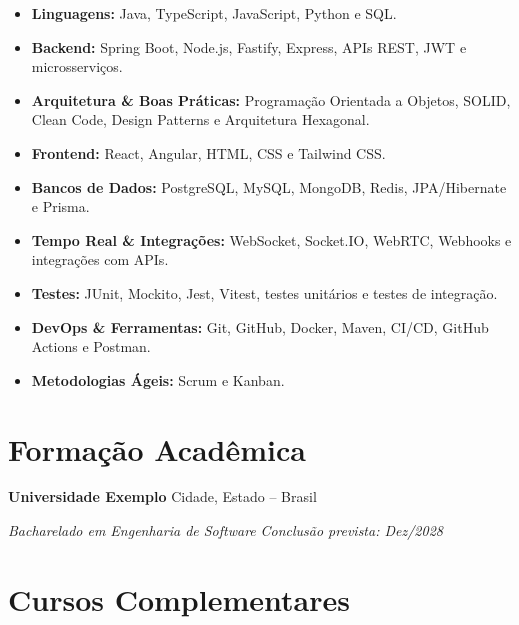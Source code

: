 \documentclass[a4paper,10pt]{article}
\begin{document}
\begin{itemize}[itemsep=0.03em, topsep=0.08em]

    \item \textbf{Linguagens:}
    Java, TypeScript, JavaScript, Python e SQL.

    \item \textbf{Backend:}
    Spring Boot, Node.js, Fastify, Express, APIs REST, JWT e microsserviços.

    \item \textbf{Arquitetura \& Boas Práticas:}
    Programação Orientada a Objetos, SOLID, Clean Code, Design Patterns e Arquitetura Hexagonal.

    \item \textbf{Frontend:}
    React, Angular, HTML, CSS e Tailwind CSS.

    \item \textbf{Bancos de Dados:}
    PostgreSQL, MySQL, MongoDB, Redis, JPA/Hibernate e Prisma.

    \item \textbf{Tempo Real \& Integrações:}
    WebSocket, Socket.IO, WebRTC, Webhooks e integrações com APIs.

    \item \textbf{Testes:}
    JUnit, Mockito, Jest, Vitest, testes unitários e testes de integração.

    \item \textbf{DevOps \& Ferramentas:}
    Git, GitHub, Docker, Maven, CI/CD, GitHub Actions e Postman.

    \item \textbf{Metodologias Ágeis:}
    Scrum e Kanban.

\end{itemize}


\section{Formação Acadêmica}

\textbf{Universidade Exemplo}
\hfill
Cidade, Estado -- Brasil

\textit{Bacharelado em Engenharia de Software}
\hfill
\textit{Conclusão prevista: Dez/2028}


\section{Cursos Complementares}
\end{document}
